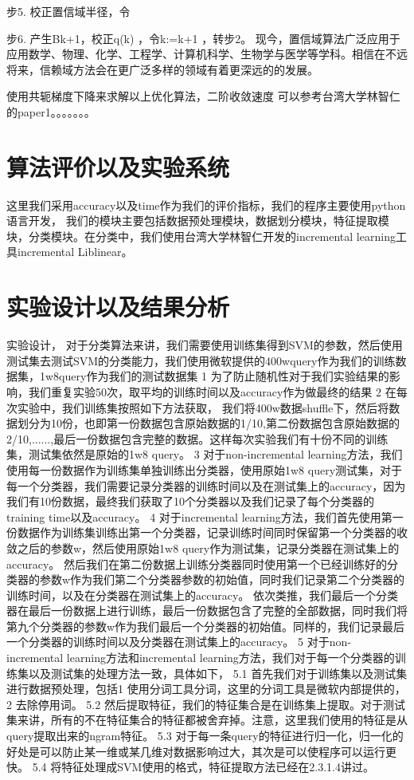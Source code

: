 \documentclass[master]{njuthesis}
\begin{document}
步5. 校正置信域半径，令

步6. 产生Bk+1，校正q(k) ，令k:=k+1 ，转步2。
现今，置信域算法广泛应用于应用数学、物理、化学、工程学、计算机科学、生物学与医学等学科。相信在不远将来，信赖域方法会在更广泛多样的领域有着更深远的的发展。

使用共轭梯度下降来求解以上优化算法，二阶收敛速度
可以参考台湾大学林智仁的paper1。。。。。。。

\section{ 算法评价以及实验系统}
这里我们采用accuracy以及time作为我们的评价指标，我们的程序主要使用python语言开发， 我们的模块主要包括数据预处理模块，数据划分模块，特征提取模块，分类模块。在分类中，我们使用台湾大学林智仁开发的incremental learning工具incremental Liblinear。

\section{ 实验设计以及结果分析}

实验设计，
对于分类算法来讲，我们需要使用训练集得到SVM的参数，然后使用测试集去测试SVM的分类能力，我们使用微软提供的400wquery作为我们的训练数据集，1w8query作为我们的测试数据集
1 为了防止随机性对于我们实验结果的影响，我们重复实验50次，取平均的训练时间以及accuracy作为做最终的结果
2 在每次实验中，我们训练集按照如下方法获取， 我们将400w数据shuffle下，然后将数据划分为10份，也即第一份数据包含原始数据的1/10,第二份数据包含原始数据的2/10,......,最后一份数据包含完整的数据。这样每次实验我们有十份不同的训练集，测试集依然是原始的1w8 query。
3 对于non-incremental learning方法，我们使用每一份数据作为训练集单独训练出分类器，使用原始1w8 query测试集，对于每一个分类器，我们需要记录分类器的训练时间以及在测试集上的accuracy，因为我们有10份数据，最终我们获取了10个分类器以及我们记录了每个分类器的training time以及accuracy。
4 对于incremental learning方法，我们首先使用第一份数据作为训练集训练出第一个分类器，记录训练时间同时保留第一个分类器的收敛之后的参数w，然后使用原始1w8 query作为测试集，记录分类器在测试集上的accuracy。
然后我们在第二份数据上训练分类器同时使用第一个已经训练好的分类器的参数w作为我们第二个分类器参数的初始值，同时我们记录第二个分类器的训练时间，以及在分类器在测试集上的accuracy。
依次类推，我们最后一个分类器在最后一份数据上进行训练，最后一份数据包含了完整的全部数据，同时我们将第九个分类器的参数w作为我们最后一个分类器的初始值。同样的，我们记录最后一个分类器的训练时间以及分类器在测试集上的accuracy。
5 对于non-incremental learning方法和incremental learning方法，我们对于每一个分类器的训练集以及测试集的处理方法一致，具体如下，
5.1 首先我们对于训练集以及测试集进行数据预处理，包括1 使用分词工具分词，这里的分词工具是微软内部提供的，2 去除停用词。
5.2 然后提取特征，我们的特征集合是在训练集上提取。对于测试集来讲，所有的不在特征集合的特征都被舍弃掉。注意，这里我们使用的特征是从query提取出来的ngram特征。
5.3 对于每一条query的特征进行归一化，归一化的好处是可以防止某一维或某几维对数据影响过大，其次是可以使程序可以运行更快。
5.4 将特征处理成SVM使用的格式，特征提取方法已经在2.3.1.4讲过。
\end{document}
